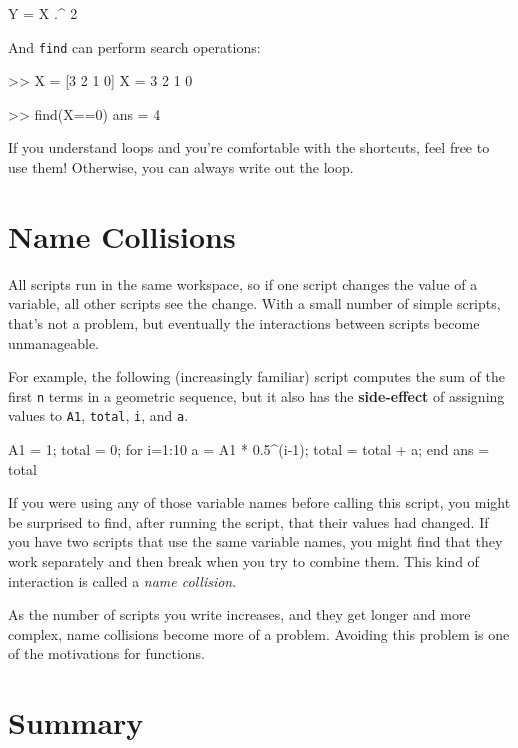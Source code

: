 \begin{code}
Y = X .^ 2
\end{code}

And {\tt find} can perform search operations:

\begin{code}
>> X = [3 2 1 0]
X = 3     2     1     0

>> find(X==0)
ans = 4
\end{code}

If you understand loops and you're comfortable with the
shortcuts, feel free to use them!  Otherwise, you can always write
out the loop.


\section{Name Collisions}
\label{collision}


All scripts run in the same workspace, so if one script changes the value of a variable, all other scripts see the change.  With a small number of simple scripts, that's not a problem, but eventually the interactions between scripts become unmanageable.

For example, the following (increasingly familiar) script computes the
sum of the first {\tt n} terms in a geometric sequence, but it also
has the {\bf side-effect} of assigning values to {\tt A1}, {\tt total},
{\tt i}, and {\tt a}.

\begin{code}
A1 = 1;
total = 0;
for i=1:10
    a = A1 * 0.5^(i-1);
    total = total + a;
end
ans = total
\end{code}

If you were using any of those variable names before calling this
script, you might be surprised to find, after running the script,
that their values had changed.  If you have two scripts that use
the same variable names, you might find that they work separately
and then break when you try to combine them.  This kind of
interaction is called a \emph{name collision}.


As the number of scripts you write increases, and they get longer
and more complex, name collisions become more of a problem.  Avoiding
this problem is one of the motivations for functions.

\section{Summary}


